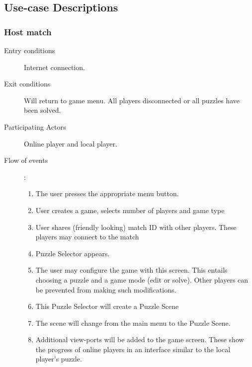 \documentclass[12pt]{article}
\begin{document}
\subsection{Use-case Descriptions}
\begin{mdframed}
    \subsubsection{Host match}
    \begin{description}
        \item[Entry conditions] Internet connection.
        \item[Exit conditions] Will return to game menu. All players
            disconnected or all puzzles have been solved.
        \item[Participating Actors] Online player and local player.
        \item[Flow of events]:
            \begin{enumerate}
                \item The user presses the appropriate menu button.
                \item User creates a game, selects number of players and game
                    type
                \item User shares (friendly looking) match ID with other
                    players. These players may connect to the match
                \item Puzzle Selector appears.
                \item The user may configure the game with this screen.
                    This
                    entails choosing a puzzle and a game mode (edit or solve).
                    Other players can be prevented from making such
                    modifications.
                \item This Puzzle Selector will create a Puzzle Scene
                \item The scene will change from the main menu to the Puzzle
                    Scene.
                \item Additional view-ports will be added to the game screen.
                These show the progress of online players in an interface
                similar to the local player's puzzle.

            \end{enumerate}
    \end{description}
\end{mdframed}
\end{document}

